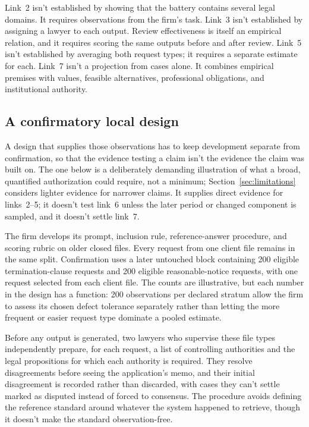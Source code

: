 \documentclass[12pt]{article}
\begin{document}
Link~2 isn't established by showing that the battery contains several legal domains. It requires observations from the firm's task. Link~3 isn't established by assigning a lawyer to each output. Review effectiveness is itself an empirical relation, and it requires scoring the same outputs before and after review. Link~5 isn't established by averaging both request types; it requires a separate estimate for each. Link~7 isn't a projection from cases alone. It combines empirical premises with values, feasible alternatives, professional obligations, and institutional authority.

\subsection{A confirmatory local design}\label{ssec:legal_design}

A design that supplies those observations has to keep development separate from confirmation, so that the evidence testing a claim isn't the evidence the claim was built on. The one below is a deliberately demanding illustration of what a broad, quantified authorization could require, not a minimum; Section~\ref{sec:limitations} considers lighter evidence for narrower claims. It supplies direct evidence for links~2--5; it doesn't test link~6 unless the later period or changed component is sampled, and it doesn't settle link~7.

The firm develops its prompt, inclusion rule, reference-answer procedure, and scoring rubric on older closed files. Every request from one client file remains in the same split. Confirmation uses a later untouched block containing 200 eligible termination-clause requests and 200 eligible reasonable-notice requests, with one request selected from each client file. The counts are illustrative, but each number in the design has a function: 200 observations per declared stratum allow the firm to assess its chosen defect tolerance separately rather than letting the more frequent or easier request type dominate a pooled estimate.

Before any output is generated, two lawyers who supervise these file types independently prepare, for each request, a list of controlling authorities and the legal propositions for which each authority is required. They resolve disagreements before seeing the application's memo, and their initial disagreement is recorded rather than discarded, with cases they can't settle marked as disputed instead of forced to consensus. The procedure avoids defining the reference standard around whatever the system happened to retrieve, though it doesn't make the standard observation-free.
\end{document}
